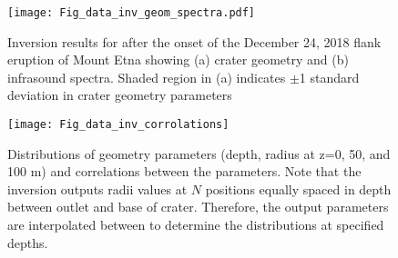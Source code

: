 \documentclass[10pt]{article}
\begin{document}
\begin{figure}[h!]
\centering
\texttt{[image: Fig\_data\_inv\_geom\_spectra.pdf]}
\caption{Inversion results for after the onset of the December 24, 2018 flank eruption of Mount Etna showing (a) crater geometry and (b) infrasound spectra. Shaded region in (a) indicates $\pm$1 standard deviation in crater geometry parameters}
\label{fig:data inversion}
\end{figure}

\begin{figure}[t!]
\centering
\texttt{[image: Fig\_data\_inv\_corrolations]}
\caption{Distributions of geometry parameters (depth, radius at z=0, 50, and 100 m) and correlations between the parameters. Note that the inversion outputs radii values at $N$ positions equally spaced in depth between outlet and base of crater. Therefore, the output parameters are interpolated between to determine the distributions at specified depths. }
\label{fig:data corr}
\end{figure}

\newpage


\end{document}
